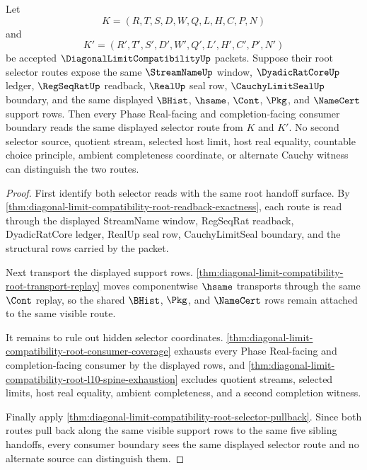 \begin{theorem}
\label{thm:diagonal-limit-compatibility-root-selector-uniqueness}
Let
$$
K=(R,T,S,D,W,Q,L,H,C,P,N)
$$
and
$$
K'=(R',T',S',D',W',Q',L',H',C',P',N')
$$
be accepted $\DiagonalLimitCompatibilityUp$ packets. Suppose their root selector routes expose the same $\StreamNameUp$ window, $\DyadicRatCoreUp$ ledger, $\RegSeqRatUp$ readback, $\RealUp$ seal row, $\CauchyLimitSealUp$ boundary, and the same displayed $\BHist$, $\hsame$, $\Cont$, $\Pkg$, and $\NameCert$ support rows. Then every Phase Real-facing and completion-facing consumer boundary reads the same displayed selector route from $K$ and $K'$. No second selector source, quotient stream, selected host limit, host real equality, countable choice principle, ambient completeness coordinate, or alternate Cauchy witness can distinguish the two routes.
\end{theorem}
\begin{proof}
First identify both selector reads with the same root handoff surface. By \autoref{thm:diagonal-limit-compatibility-root-readback-exactness}, each route is read through the displayed StreamName window, RegSeqRat readback, DyadicRatCore ledger, RealUp seal row, CauchyLimitSeal boundary, and the structural rows carried by the packet.

Next transport the displayed support rows. \autoref{thm:diagonal-limit-compatibility-root-transport-replay} moves componentwise $\hsame$ transports through the same $\Cont$ replay, so the shared $\BHist$, $\Pkg$, and $\NameCert$ rows remain attached to the same visible route.

It remains to rule out hidden selector coordinates. \autoref{thm:diagonal-limit-compatibility-root-consumer-coverage} exhausts every Phase Real-facing and completion-facing consumer by the displayed rows, and \autoref{thm:diagonal-limit-compatibility-root-l10-spine-exhaustion} excludes quotient streams, selected limits, host real equality, ambient completeness, and a second completion witness.

Finally apply \autoref{thm:diagonal-limit-compatibility-root-selector-pullback}. Since both routes pull back along the same visible support rows to the same five sibling handoffs, every consumer boundary sees the same displayed selector route and no alternate source can distinguish them.
\end{proof}

